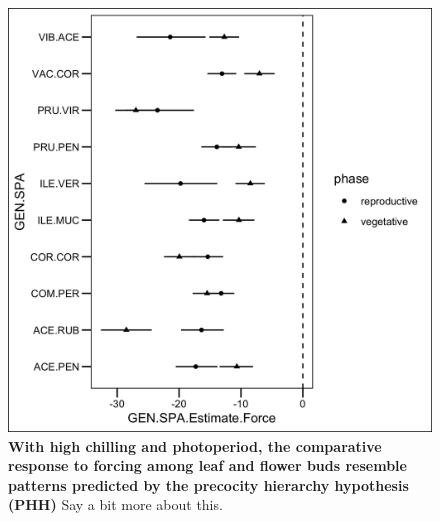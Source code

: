 \documentclass[11pt]{article}
\begin{document}
\begin{figure}[h!]
    \centering
         \includegraphics[width=\textwidth]{..//Plots/Flobuds_manuscript_figs/phh_plot.png}
    \caption{\textbf{With high chilling and photoperiod, the comparative response to forcing  among leaf and flower buds resemble patterns predicted by the precocity hierarchy hypothesis (PHH)} Say a bit more about this.}
    \label{fig:phh}
\end{figure}
\end{document}
